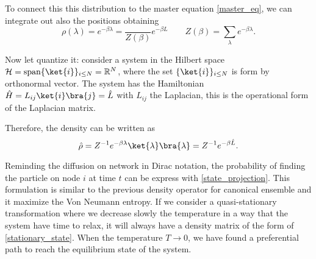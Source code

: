 To connect this this distribution to the master equation \ref{master_eq}, we can integrate out also the positions obtaining
\begin{equation}
    \rho(\lambda) = e^{-\beta \lambda} = \frac{}{Z(\beta)} e^{-\beta L} \qquad Z(\beta) = \sum_\lambda e^{-\beta \lambda}.
\end{equation}

Now let quantize it: consider a system in the Hilbert space $\mathcal{H} = \mathrm{span}\{\ket{i}\}_{i\leq N} = \mathbb{R}^N$, where the set $\{\ket{i}\}_{i\leq N}$ is form by orthonormal vector. The system has the Hamiltonian $\hat H = L_{ij}\ket{i}\bra{j} = \hat L$ with $L_{ij}$ the Laplacian, this is the operational form of the Laplacian matrix.

Therefore, the density can be written as
\begin{equation}\label{stationary_state}
    \hat \rho = Z^{-1}e^{-\beta \lambda}  \ket{\lambda}\bra{\lambda}= Z^{-1} e^{-\beta \hat L}.
\end{equation}

Reminding the diffusion on network in Dirac notation, the probability of finding the particle on node $i$ at time $t$ can be express with \ref{state_projection}.
This formulation is similar to the previous density operator for canonical ensemble and it maximize the Von Neumann entropy.
If we consider a quasi-stationary transformation where we decrease slowly the temperature in a way that the system have time to relax, it will always have a density matrix of the form of \ref{stationary_state}. When the temperature $T \rightarrow 0$, we have found a preferential path to reach the equilibrium state of the system.


